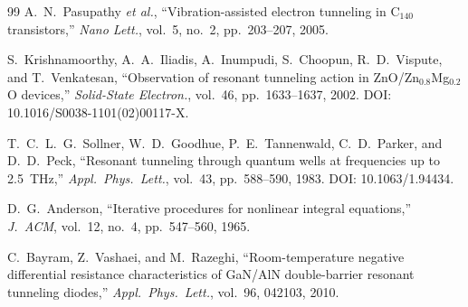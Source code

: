 \documentclass[11pt,a4paper,onecolumn]{article}
\begin{document}
\begin{thebibliography}{99}
 A.~N.~Pasupathy \textit{et al.},
``Vibration-assisted electron tunneling in C$_{140}$ transistors,''
\textit{Nano Lett.}, vol.~5, no.~2, pp.~203--207, 2005.

 S.~Krishnamoorthy, A.~A.~Iliadis,
A.~Inumpudi, S.~Choopun, R.~D.~Vispute, and T.~Venkatesan,
``Observation of resonant tunneling action in
ZnO/Zn$_{0.8}$Mg$_{0.2}$O devices,'' \textit{Solid-State Electron.},
vol.~46, pp.~1633--1637, 2002. DOI: 10.1016/S0038-1101(02)00117-X.

 T.~C.~L.~G.~Sollner, W.~D.~Goodhue,
P.~E.~Tannenwald, C.~D.~Parker, and D.~D.~Peck, ``Resonant tunneling
through quantum wells at frequencies up to 2.5~THz,''
\textit{Appl.\ Phys.\ Lett.}, vol.~43, pp.~588--590, 1983.
DOI: 10.1063/1.94434.

 D.~G.~Anderson, ``Iterative procedures for
nonlinear integral equations,'' \textit{J.\ ACM}, vol.~12, no.~4,
pp.~547--560, 1965.

 C.~Bayram, Z.~Vashaei, and M.~Razeghi,
``Room-temperature negative differential resistance characteristics of
GaN/AlN double-barrier resonant tunneling diodes,''
\textit{Appl.\ Phys.\ Lett.}, vol.~96, 042103, 2010.

\end{thebibliography}
\end{document}
